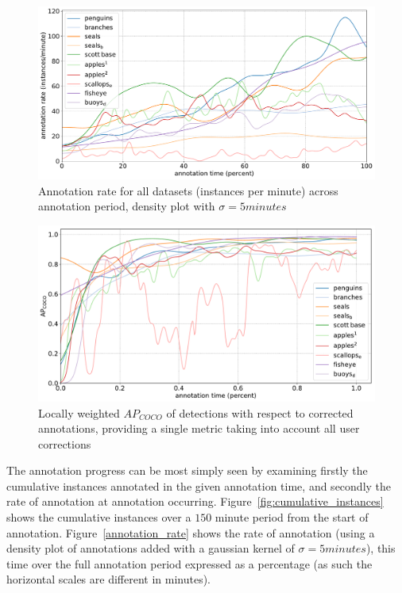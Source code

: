 \begin{figure}[H]
\centering
\includegraphics[width=1.0\linewidth]{charts/summaries/instance_rates.pdf}
\caption{ Annotation rate for all datasets (instances per minute) across annotation period, density plot with $\sigma=5minutes$ }
\label{fig:annotation_rate}
\end{figure}


\begin{figure}[H]
\centering
\includegraphics[width=1.0\linewidth]{charts/running_maps/overall.pdf}
\caption{ Locally weighted $AP_{COCO}$ of detections with respect to corrected annotations, providing a single metric taking into account all user corrections }
\label{fig:average_precision_test}
\end{figure}

The annotation progress can be most simply seen by examining firstly the cumulative instances annotated in the given annotation time, and secondly the rate of annotation at annotation occurring. Figure~\ref{fig:cumulative_instances} shows the cumulative instances over a $150$ minute period from the start of annotation. Figure~\ref{annotation_rate} shows the rate of annotation (using a density plot of annotations added with a gaussian kernel of $\sigma = 5 minutes$), this time over the full annotation period expressed as a percentage (as such the horizontal scales are different in minutes).

